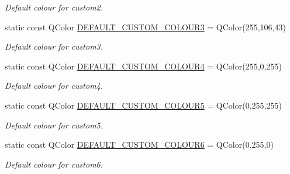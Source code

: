 \begin{DoxyCompactItemize}
\begin{DoxyCompactList}\small\item\em Default colour for custom2. \end{DoxyCompactList}\item 
\hypertarget{class_console_widget_a5c08a0f2b6fa95efdc7c86b79d70c126}{static const Q\-Color \hyperlink{class_console_widget_a5c08a0f2b6fa95efdc7c86b79d70c126}{D\-E\-F\-A\-U\-L\-T\-\_\-\-C\-U\-S\-T\-O\-M\-\_\-\-C\-O\-L\-O\-U\-R3} = Q\-Color(255,106,43)}\label{class_console_widget_a5c08a0f2b6fa95efdc7c86b79d70c126}

\begin{DoxyCompactList}\small\item\em Default colour for custom3. \end{DoxyCompactList}\item 
\hypertarget{class_console_widget_a82acbc07440b3d74150fe7d72279ae2b}{static const Q\-Color \hyperlink{class_console_widget_a82acbc07440b3d74150fe7d72279ae2b}{D\-E\-F\-A\-U\-L\-T\-\_\-\-C\-U\-S\-T\-O\-M\-\_\-\-C\-O\-L\-O\-U\-R4} = Q\-Color(255,0,255)}\label{class_console_widget_a82acbc07440b3d74150fe7d72279ae2b}

\begin{DoxyCompactList}\small\item\em Default colour for custom4. \end{DoxyCompactList}\item 
\hypertarget{class_console_widget_aad9ca0556290f9d68e01f13390acee04}{static const Q\-Color \hyperlink{class_console_widget_aad9ca0556290f9d68e01f13390acee04}{D\-E\-F\-A\-U\-L\-T\-\_\-\-C\-U\-S\-T\-O\-M\-\_\-\-C\-O\-L\-O\-U\-R5} = Q\-Color(0,255,255)}\label{class_console_widget_aad9ca0556290f9d68e01f13390acee04}

\begin{DoxyCompactList}\small\item\em Default colour for custom5. \end{DoxyCompactList}\item 
\hypertarget{class_console_widget_a29de764d1511c834b28247784a115b4d}{static const Q\-Color \hyperlink{class_console_widget_a29de764d1511c834b28247784a115b4d}{D\-E\-F\-A\-U\-L\-T\-\_\-\-C\-U\-S\-T\-O\-M\-\_\-\-C\-O\-L\-O\-U\-R6} = Q\-Color(0,255,0)}\label{class_console_widget_a29de764d1511c834b28247784a115b4d}

\begin{DoxyCompactList}\small\item\em Default colour for custom6. \end{DoxyCompactList}\end{DoxyCompactItemize}
